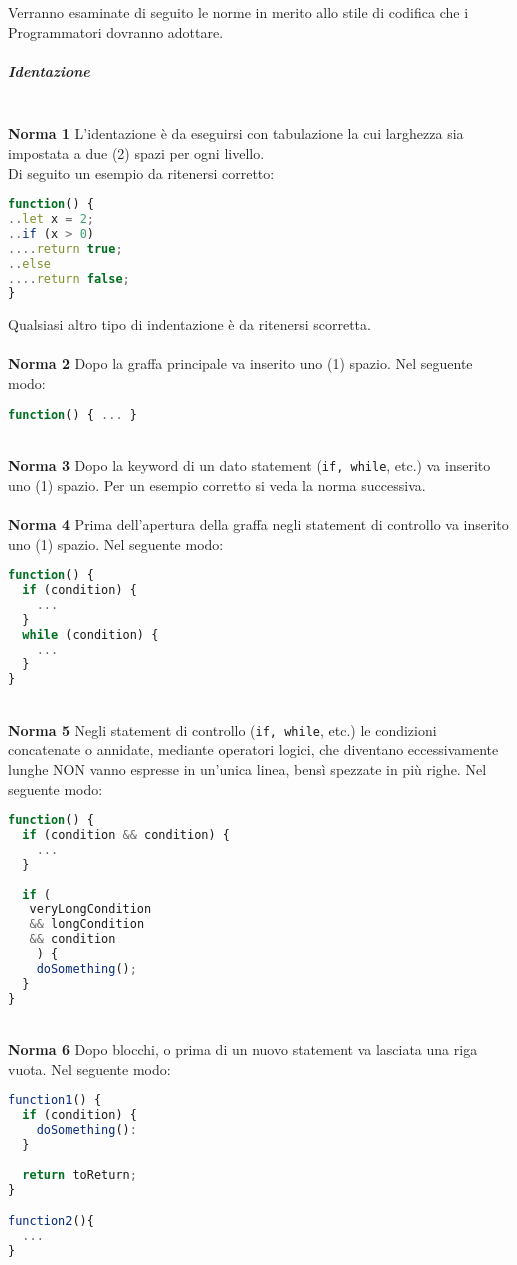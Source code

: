 Verranno esaminate di seguito le norme in merito allo stile di codifica che i Programmatori dovranno adottare.

\subparagraph{Identazione}\-\\
\textbf{Norma 1}
L'identazione è da eseguirsi con tabulazione la cui larghezza sia impostata a due (2) spazi per ogni livello.\\
Di seguito un esempio da ritenersi corretto:
\begin{lstlisting}[language=JavaScript]
function() {
..let x = 2;
..if (x > 0)
....return true;
..else
....return false;
}
\end{lstlisting}
Qualsiasi altro tipo di indentazione è da ritenersi scorretta.\\
\-\\
\textbf{Norma 2}
Dopo la graffa principale va inserito uno (1) spazio. Nel seguente modo:
\begin{lstlisting}[language=JavaScript]
function() { ... }
\end{lstlisting}
\-\\
\textbf{Norma 3}
Dopo la keyword di un dato statement (\texttt{if, while}, etc.) va inserito uno (1) spazio. Per un esempio corretto si veda la norma successiva.\\
\-\\
\textbf{Norma 4}
Prima dell'apertura della graffa negli statement di controllo va inserito uno (1) spazio. Nel seguente modo:
\begin{lstlisting}[language=JavaScript]
function() {
  if (condition) {
    ...  
  }
  while (condition) {
    ...
  }
}
\end{lstlisting}
\-\\
\textbf{Norma 5}
Negli statement di controllo (\texttt{if, while}, etc.) le condizioni concatenate o annidate, mediante operatori logici, che diventano eccessivamente lunghe NON vanno espresse in un'unica linea, bensì spezzate in più righe. Nel seguente modo:
\begin{lstlisting}[language=JavaScript]
function() {
  if (condition && condition) {
    ...  
  }
  
  if (
   veryLongCondition
   && longCondition
   && condition
    ) {
    doSomething();
  }
}
\end{lstlisting}
\-\\
\textbf{Norma 6}
Dopo blocchi, o prima di un nuovo statement va lasciata una riga vuota. Nel seguente modo:
\begin{lstlisting}[language=JavaScript]
function1() {
  if (condition) {
    doSomething():  
  }
  
  return toReturn;  
}

function2(){
  ...
}
\end{lstlisting}
